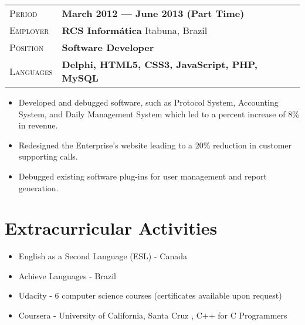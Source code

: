 \documentclass[10pt, a4paper, oneside, final]{scrartcl} %
\newcommand{\gray}{\rowcolor[gray]{.90}} %
\begin{document}
\begin{center}
\begin{tabularx}{1.0\linewidth}{>{\raggedleft\scshape}p{2.2cm}X}
\gray Period & \textbf{March 2012 --- June 2013 (Part Time)}\\
\gray Employer & \textbf{RCS Informática} \hfill Itabuna, Brazil\\
\gray Position & \textbf{Software Developer}\\
\gray Languages & \textbf{Delphi, HTML5, CSS3, JavaScript, PHP, MySQL}\\
\end{tabularx}
\end{center}

\begin{itemize}\itemsep1.5pt
\item Developed and debugged software, such as Protocol System, Accounting System, and Daily Management System which led to a percent increase of 8\% in revenue.

\item Redesigned the Enterprise's website leading to a 20\% reduction in customer supporting calls.

\item Debugged existing software plug-ins for user management and report generation.

\end{itemize}


\section{Extracurricular Activities}
\begin{center}
\begin{itemize}\itemsep1.5pt
\item {English as a Second Language (ESL) - Canada}
\item Achieve Languages - Brazil
\item Udacity - 6 computer science courses (certificates available upon request)
\item Coursera - University of California, Santa Cruz , C++ for C Programmers

\end{itemize}
\end{center}
\end{document}
